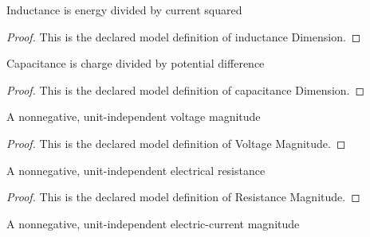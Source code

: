 \begin{definition}
  \label{def:physics:phyx-mini-0987:phyxminiproblems-problemphyxmini0987-inductancedimension}
  Inductance is energy divided by current squared
\end{definition}
\begin{proof}
  This is the declared model definition of inductance Dimension.
\end{proof}
\begin{definition}
  \label{def:physics:phyx-mini-0987:phyxminiproblems-problemphyxmini0987-capacitancedimension}
  Capacitance is charge divided by potential difference
\end{definition}
\begin{proof}
  This is the declared model definition of capacitance Dimension.
\end{proof}
\begin{definition}
  \label{def:physics:phyx-mini-0987:phyxminiproblems-problemphyxmini0987-voltagemagnitude}
  A nonnegative, unit-independent voltage magnitude
\end{definition}
\begin{proof}
  This is the declared model definition of Voltage Magnitude.
\end{proof}
\begin{definition}
  \label{def:physics:phyx-mini-0987:phyxminiproblems-problemphyxmini0987-resistancemagnitude}
  A nonnegative, unit-independent electrical resistance
\end{definition}
\begin{proof}
  This is the declared model definition of Resistance Magnitude.
\end{proof}
\begin{definition}
  \label{def:physics:phyx-mini-0987:phyxminiproblems-problemphyxmini0987-currentmagnitude}
  A nonnegative, unit-independent electric-current magnitude
\end{definition}
